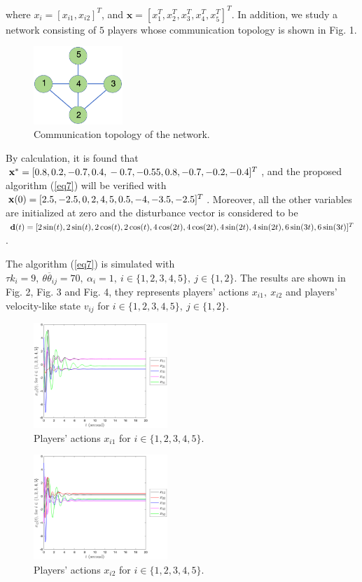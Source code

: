 \documentclass[lettersize,journal]{IEEEtran}
\begin{document}
where $x_i = [x_{i1}, x_{i2}]^T$, and $\mathbf{x}=[x_1^T,x_2^T,x_3^T,x_4^T,x_5^T]^T$. In addition, we study a network consisting of $5$ players whose communication topology is shown in Fig. 1.
\begin{figure}[htbp]
    \centering
    \includegraphics[width=0.3\textwidth]{img/fig1.eps}
    \caption{Communication topology of the network.}
\end{figure}

By calculation, it is found that $\mathbf{x}^* = [0.8,0.2,-0.7,0.4,\\
    -0.7,-0.55,0.8,-0.7,-0.2,-0.4]^T$,
and the proposed algorithm (\ref{eq7}) will be verified with $\mathbf{x}(0) = [2.5,-2.5,0,2,4,5,\\0.5,-4,-3.5,-2.5]^T$. Moreover, all the other variables are initialized at zero and the disturbance vector is considered to be $\mathbf{d}(t)=[2\sin(t),2\sin(t),2\cos(t),2\cos(t),4\cos(2t),\\4\cos(2t),4\sin(2t),4\sin(2t),6\sin(3t),6\sin(3t)]^T$.

The algorithm (\ref{eq7}) is simulated with $\tau k_i = 9,~\theta\overline{\theta}_{ij}=70,~\alpha_i = 1,~i\in \{1,2,3,4,5\},~j\in \{1,2\}$. The results are shown in Fig. 2, Fig. 3 and Fig. 4, they represents players' actions $x_{i1}, ~x_{i2}$ and players' velocity-like state $v_{ij}$ for $i\in \{1,2,3,4,5\},~j\in \{1,2\}$.
\begin{figure}[htbp]
    \centering
    \includegraphics[width=0.45\textwidth]{img/xi1.eps}
    \caption{Players' actions $x_{i1}$ for $i\in \{1,2,3,4,5\}$.}
\end{figure}

\begin{figure}[htbp]
    \centering
    \includegraphics[width=0.45\textwidth]{img/xi2.eps}
    \caption{Players' actions $x_{i2}$ for $i\in \{1,2,3,4,5\}$.}
\end{figure}
\end{document}
